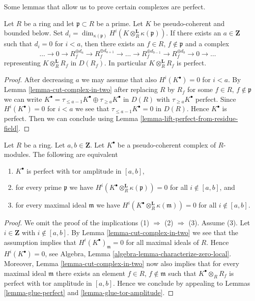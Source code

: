 \noindent
Some lemmas that allow us to prove certain complexes are perfect.

\begin{lemma}
\label{lemma-lift-bounded-pseudo-coherent-to-perfect}
Let $R$ be a ring and let $\mathfrak p \subset R$ be a prime.
Let $K$ be pseudo-coherent and bounded below. Set
$d_i = \dim_{\kappa(\mathfrak p)}
H^i(K \otimes_R^\mathbf{L} \kappa(\mathfrak p))$.
If there exists an $a \in \mathbf{Z}$ such that $d_i = 0$ for $i < a$,
then there exists an $f \in R$, $f \not \in \mathfrak p$ and a
complex
$$
\ldots \to 0 \to R_f^{\oplus d_a} \to R_f^{\oplus d_{a + 1}} \to
\ldots \to
R_f^{\oplus d_{b - 1}} \to
R_f^{\oplus d_b} \to 0
\to \ldots
$$
representing $K \otimes_R^\mathbf{L} R_f$ in $D(R_f)$.
In particular $K \otimes_R^\mathbf{L} R_f$ is perfect.
\end{lemma}

\begin{proof}
After decreasing $a$ we may assume that also $H^i(K^\bullet) = 0$ for
$i < a$. By Lemma \ref{lemma-cut-complex-in-two} after replacing $R$ by $R_f$
for some $f \in R$, $f \not \in \mathfrak p$
we can write $K^\bullet = \tau_{\leq a - 1}K^\bullet \oplus
\tau_{\geq a}K^\bullet$ in $D(R)$ with $\tau_{\geq a}K^\bullet$
perfect. Since $H^i(K^\bullet) = 0$ for $i < a$ we see that
$\tau_{\leq a - 1}K^\bullet = 0$ in $D(R)$. Hence $K^\bullet$
is perfect. Then we can conclude using
Lemma \ref{lemma-lift-perfect-from-residue-field}.
\end{proof}

\begin{lemma}
\label{lemma-check-perfect-pointwise}
Let $R$ be a ring. Let $a, b \in \mathbf{Z}$.
Let $K^\bullet$ be a pseudo-coherent complex of $R$-modules.
The following are equivalent
\begin{enumerate}
\item $K^\bullet$ is perfect with tor amplitude in $[a, b]$,
\item for every prime $\mathfrak p$ we have
$H^i(K^\bullet \otimes_R^{\mathbf{L}} \kappa(\mathfrak p)) = 0$ for all
$i \not \in [a, b]$, and
\item for every maximal ideal $\mathfrak m$ we have
$H^i(K^\bullet \otimes_R^{\mathbf{L}} \kappa(\mathfrak m)) = 0$ for all
$i \not \in [a, b]$.
\end{enumerate}
\end{lemma}

\begin{proof}
We omit the proof of the implications (1) $\Rightarrow$ (2) $\Rightarrow$ (3).
Assume (3). Let $i \in \mathbf{Z}$ with $i \not \in [a, b]$. By
Lemma \ref{lemma-cut-complex-in-two}
we see that the assumption implies that $H^i(K^\bullet)_{\mathfrak m} = 0$
for all maximal ideals of $R$. Hence $H^i(K^\bullet) = 0$, see
Algebra, Lemma \ref{algebra-lemma-characterize-zero-local}.
Moreover,
Lemma \ref{lemma-cut-complex-in-two}
now also implies that for every maximal ideal
$\mathfrak m$ there exists an element $f \in R$, $f \not \in \mathfrak m$
such that $K^\bullet \otimes_R R_f$ is perfect with tor amplitude in
$[a, b]$. Hence we conclude by appealing to
Lemmas \ref{lemma-glue-perfect} and \ref{lemma-glue-tor-amplitude}.
\end{proof}


